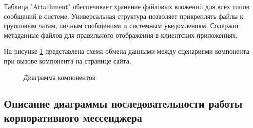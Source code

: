 Таблица "Attachment" обеспечивает хранение файловых вложений для всех типов сообщений в системе. Универсальная структура позволяет прикреплять файлы к групповым чатам, личным сообщениям и системным уведомлениям. Содержит метаданные файлов для правильного отображения в клиентских приложениях.

На рисунке \ref{data:image} представлена схема обмена данными между сценариями компонента при вызове компонента на странице сайта.

\begin{figure}[H]
\caption{Диаграмма компонентов}
\label{data:image}
\end{figure}

\subsection{Описание диаграммы последовательности работы корпоративного мессенджера}

